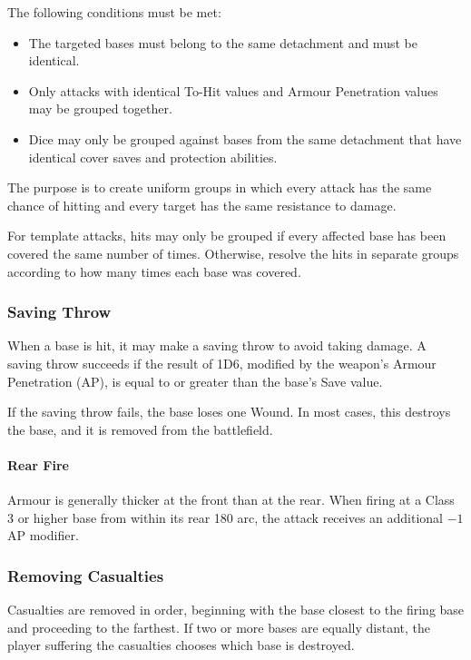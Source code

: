 The following conditions must be met:

\begin{itemize}
    \item The targeted bases must belong to the same detachment and must be identical.
    \item Only attacks with identical To-Hit values and Armour Penetration values may be grouped together.
    \item Dice may only be grouped against bases from the same detachment that have identical cover saves and protection abilities.
\end{itemize}

The purpose is to create uniform groups in which every attack has the same chance of hitting and every target has the same resistance to damage.

For template attacks, hits may only be grouped if every affected base has been covered the same number of times. Otherwise, resolve the hits in separate groups according to how many times each base was covered.

\subsubsection{Saving Throw}

When a base is hit, it may make a saving throw to avoid taking damage. A saving throw succeeds if the result of 1D6, modified by the weapon's Armour Penetration (AP), is equal to or greater than the base's Save value.

If the saving throw fails, the base loses one Wound. In most cases, this destroys the base, and it is removed from the battlefield.

\paragraph{Rear Fire}

Armour is generally thicker at the front than at the rear. When firing at a Class 3 or higher base from within its rear 180\textdegree{} arc, the attack receives an additional $-1$ AP modifier.

\subsubsection{Removing Casualties}

Casualties are removed in order, beginning with the base closest to the firing base and proceeding to the farthest. If two or more bases are equally distant, the player suffering the casualties chooses which base is destroyed.

